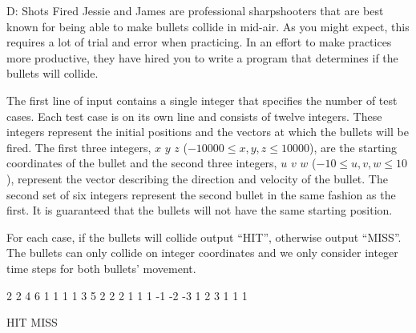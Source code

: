 \begin{problem}{D: Shots Fired}
Jessie and James are professional sharpshooters that are best known for being able to make bullets collide in mid-air.
As you might expect, this requires a lot of trial and error when practicing.
In an effort to make practices more productive, they have hired you to write a program that determines if the bullets will collide.
\end{problem}

\begin{formalin}
The first line of input contains a single integer that specifies the number of test cases.
Each test case is on its own line and consists of twelve integers.
These integers represent the initial positions and the vectors at which the bullets will be fired.
The first three integers, $x$ $y$ $z$ ($-10000 \leq x, y, z \leq 10000$), are the starting coordinates of the bullet and the second three integers, $u$ $v$ $w$ ($-10 \leq u, v, w \leq 10$), represent the vector describing the direction and velocity of the bullet.
The second set of six integers represent the second bullet in the same fashion as the first.
It is guaranteed that the bullets will not have the same starting position.
\end{formalin}

\begin{formalout}
For each case, if the bullets will collide output ``HIT'', otherwise output ``MISS''.
The bullets can only collide on integer coordinates and we only consider integer time steps for both bullets' movement. 
\end{formalout}

\begin{datain}
2
2 4 6 1 1 1 1 3 5 2 2 2
1 1 1 -1 -2 -3 1 2 3 1 1 1
\end{datain}

\begin{dataout}
HIT
MISS
\end{dataout}

